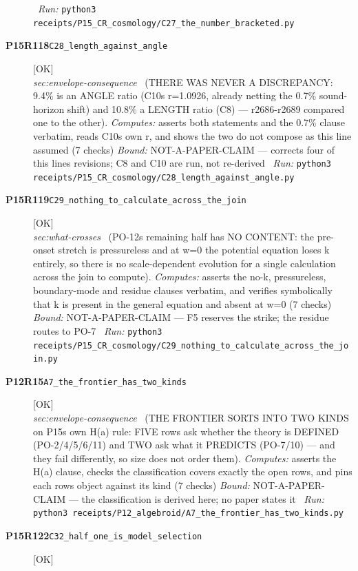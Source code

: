 \begin{description}
\ \emph{Run:} \texttt{python3 receipts/P15\_CR\_cosmology/C27\_the\_number\_bracketed.py}
\item[\rcptlabel{C28_length_against_angle}{P15R118}\textbf{P15R118}\quad\texttt{C28\_length\_against\_angle}]\hfill\textsf{[OK]}\\
\textit{sec:envelope-consequence} \ (THERE WAS NEVER A DISCREPANCY: 9.4\% is an ANGLE ratio (C10s r=1.0926, already netting the 0.7\% sound-horizon shift) and 10.8\% a LENGTH ratio (C8) --- r2686-r2689 compared one to the other). 
\emph{Computes:} asserts both statements and the 0.7\% clause verbatim, reads C10s own r, and shows the two do not compose as this line assumed (7 checks)
 \emph{Bound:} NOT-A-PAPER-CLAIM --- corrects four of this lines revisions; C8 and C10 are run, not re-derived
\ \emph{Run:} \texttt{python3 receipts/P15\_CR\_cosmology/C28\_length\_against\_angle.py}
\item[\rcptlabel{C29_nothing_to_calculate_across_the_join}{P15R119}\textbf{P15R119}\quad\texttt{C29\_nothing\_to\_calculate\_across\_the\_join}]\hfill\textsf{[OK]}\\
\textit{sec:what-crosses} \ (PO-12s remaining half has NO CONTENT: the pre-onset stretch is pressureless and at w=0 the potential equation loses k entirely, so there is no scale-dependent evolution for a single calculation across the join to compute). 
\emph{Computes:} asserts the no-k, pressureless, boundary-mode and residue clauses verbatim, and verifies symbolically that k is present in the general equation and absent at w=0 (7 checks)
 \emph{Bound:} NOT-A-PAPER-CLAIM --- F5 reserves the strike; the residue routes to PO-7
\ \emph{Run:} \texttt{python3 receipts/P15\_CR\_cosmology/C29\_nothing\_to\_calculate\_across\_the\_join.py}
\item[\rcptlabel{A7_the_frontier_has_two_kinds}{P12R15}\textbf{P12R15}\quad\texttt{A7\_the\_frontier\_has\_two\_kinds}]\hfill\textsf{[OK]}\\
\textit{sec:envelope-consequence} \ (THE FRONTIER SORTS INTO TWO KINDS on P15s own H(a) rule: FIVE rows ask whether the theory is DEFINED (PO-2/4/5/6/11) and TWO ask what it PREDICTS (PO-7/10) --- and they fail differently, so size does not order them). 
\emph{Computes:} asserts the H(a) clause, checks the classification covers exactly the open rows, and pins each rows object against its kind (7 checks)
 \emph{Bound:} NOT-A-PAPER-CLAIM --- the classification is derived here; no paper states it
\ \emph{Run:} \texttt{python3 receipts/P12\_algebroid/A7\_the\_frontier\_has\_two\_kinds.py}
\item[\rcptlabel{C32_half_one_is_model_selection}{P15R122}\textbf{P15R122}\quad\texttt{C32\_half\_one\_is\_model\_selection}]\hfill\textsf{[OK]}\\

\end{description}
